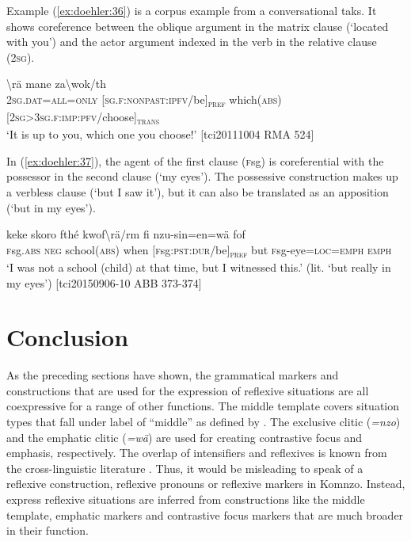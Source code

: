 \documentclass[output=paper]{langscibook}
\begin{document}
Example (\ref{ex:doehler:36}) is a corpus example from a conversational taks. It shows coreference between the oblique argument in the matrix clause (`located with you') and the actor argument indexed in the verb in the relative clause (\textsc{2sg}).


	\ea
	 {\textbackslash{rä}} {mane} {za\textbackslash{wok}/th}\\
	2\textsc{sg}.\textsc{dat}=\textsc{all}=\textsc{only}{} [\textsc{sg}.\textsc{f}:\textsc{nonpast}:\textsc{ipfv}/be]\textsubscript{\textsc{pref}} which(\textsc{abs}) [2\textsc{sg}>3\textsc{sg}.\textsc{f}:\textsc{imp}:\textsc{pfv}/choose]\textsubscript{\textsc{trans}}\\
	\glt `It is up to you, which one you choose!' [tci20111004 RMA 524] %
	\label{ex:doehler:36}
\z

In (\ref{ex:doehler:37}), the agent of the first clause (\textsc{f}sg) is coreferential with the possessor in the second clause (`my eyes'). The possessive construction makes up a verbless clause (`but I saw it'), but it can also be translated as an apposition (`but in my eyes').


	\ea
	 {keke} {skoro} {fthé} {kwof\textbackslash{rä}/rm} {fi} {nzu-sin=en=wä} {fof}\\
	\textsc{f}sg.\textsc{abs}{} \textsc{neg}{} school(\textsc{abs}) when [\textsc{f}sg:\textsc{pst}:\textsc{dur}/be]\textsubscript{\textsc{pref}} but \textsc{f}sg-eye=\textsc{loc}=\textsc{emph}{} \textsc{emph}{}\\
	\glt `I was not a school (child) at that time, but I witnessed this.' (lit. `but really in my eyes') [tci20150906-10 ABB 373-374] %
	\label{ex:doehler:37}
	\z

\section{Conclusion}\label{conclusion}
As the preceding sections have shown, the grammatical markers and constructions that are used for the expression of reflexive situations are all coexpressive for a range of other functions. The middle template covers situation types that fall under label of ``middle'' as defined by \citep{Kemmer1993}. The exclusive clitic (\emph{=nzo}) and the emphatic clitic (\emph{=wä}) are used for creating contrastive focus and emphasis, respectively. The overlap of intensifiers and reflexives is known from the cross-linguistic literature \citep{KoenigSiemund2000}. Thus, it would be misleading to speak of a reflexive construction, reflexive pronouns or reflexive markers in Komnzo. Instead, express reflexive situations are inferred from constructions like the middle template, emphatic markers and contrastive focus markers that are much broader in their function.
\end{document}

